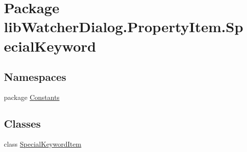 \hypertarget{namespacelib_watcher_dialog_1_1_property_item_1_1_special_keyword}{\section{Package lib\+Watcher\+Dialog.\+Property\+Item.\+Special\+Keyword}
\label{namespacelib_watcher_dialog_1_1_property_item_1_1_special_keyword}
}
\subsection*{Namespaces}
\begin{DoxyCompactItemize}
\item 
package \hyperlink{namespacelib_watcher_dialog_1_1_property_item_1_1_special_keyword_1_1_constants}{Constants}
\end{DoxyCompactItemize}
\subsection*{Classes}
\begin{DoxyCompactItemize}
\item 
class \hyperlink{classlib_watcher_dialog_1_1_property_item_1_1_special_keyword_1_1_special_keyword_item}{Special\+Keyword\+Item}
\end{DoxyCompactItemize}
